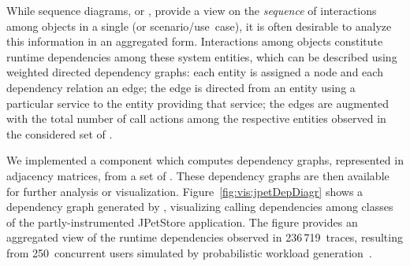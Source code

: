 While sequence diagrams, or \executionTraces{}, provide a view on the \textit{sequence} of %
interactions among objects in a single \trace{} (or scenario/use~case), it is often %
desirable to analyze this information in an aggregated %
form. %
Interactions among objects constitute runtime dependencies among these system %
entities, which can be described using weighted directed dependency graphs: %
each entity is assigned a node and each dependency relation %
an edge; the edge is directed from an entity using %
a particular service to the entity providing that service; 
the edges are augmented with the total number of call actions %
among the respective entities observed in the considered set of \traces{}. %

We implemented a \KiekerTpan{} component which computes dependency graphs, %
represented in adjacency matrices, from a set of \messageTraces{}. %
These dependency graphs are then available for further analysis or visualization. %
Figure~\ref{fig:vis:jpetDepDiagr} shows a dependency graph generated by %
\KiekerTpan{}, visualizing calling dependencies among classes of the partly-instrumented %
JPetStore application. The figure provides an aggregated view of the runtime dependencies %
observed in 236\,719~traces, resulting from 250~concurrent users simulated by probabilistic %
workload generation~\citep{vanHoornRohrHasselbring2008GeneratingProbabilisticAndIntensityVaryingWorkloadForWebBasedSoftwareSystems}. %


